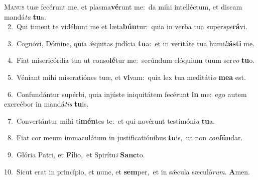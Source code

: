\lettrine{\initial\textcolor{\initialcolor}{M}}{anus} tuæ fecérunt me, et plasma\-\textbf{vé}\-runt me:~\star da mihi intelléctum, et discam mandá\textit{ta} \textbf{tu}\-a.\\
{\numbfont\textcolor{\numbcolor}{~2.}}~Qui timent te vidébunt me et læta\-\textbf{bún}\-tur:~\star quia in verba tua super\-\textit{spe}\-\textbf{rá}vi.\par
{\numbfont\textcolor{\numbcolor}{~3.}}~Cognóvi, Dómine, quia ǽquitas judícia \textbf{tu}\-a:~\star et in veritáte tua humi\-\textit{li}\-\textbf{ás}\textbf{ti} me.\par
{\numbfont\textcolor{\numbcolor}{~4.}}~Fiat misericórdia tua ut conso\-\textbf{lé}\-tur me:~\star secúndum elóquium tuum ser\textit{vo} \textbf{tu}\-o.\par
{\numbfont\textcolor{\numbcolor}{~5.}}~Véniant mihi miseratiónes tuæ, et \textbf{vi}\-vam:~\star quia lex tua meditáti\textit{o} \textbf{me}\-\textbf{a} est.\par
{\numbfont\textcolor{\numbcolor}{~6.}}~Confundántur supérbi, quia injúste iniquitátem fecérunt \textbf{in} me:~\star ego autem exercébor in mandá\textit{tis} \textbf{tu}\-is.\par
{\numbfont\textcolor{\numbcolor}{~7.}}~Convertántur mihi ti\-\textbf{mén}\-tes te:~\star et qui novérunt testimóni\textit{a} \textbf{tu}\-a.\par
{\numbfont\textcolor{\numbcolor}{~8.}}~Fiat cor meum immaculátum in justificatiónibus \textbf{tu}\-is,~\star ut non \textit{con}\-\textbf{fún}dar.\par
{\numbfont\textcolor{\numbcolor}{~9.}}~Glória Patri, et \textbf{Fí}\-lio,~\star et Spirítu\textit{i} \textbf{Sanc}\-to.\par
{\numbfont\textcolor{\numbcolor}{10.}}~Sicut erat in princípio, et nunc, et \textbf{sem}\-per,~\star et in sǽcula sæculó\-\textit{rum}\-. \textbf{A}\-men.\par
